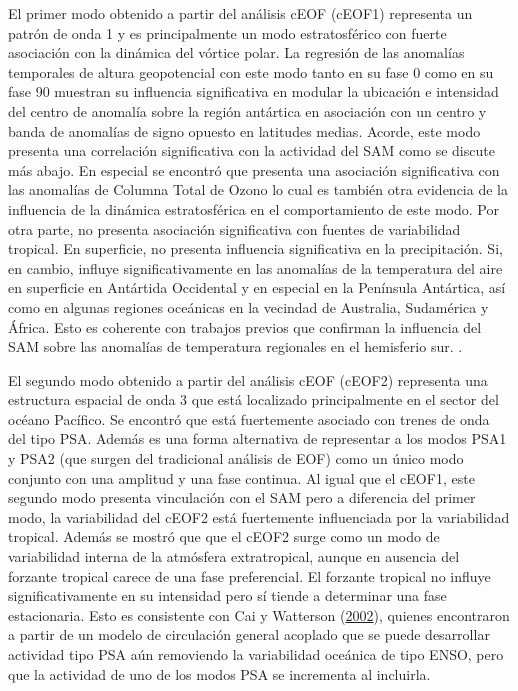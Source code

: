 \documentclass[12pt,oneside,a4paper]{reedthesis}
\begin{document}
El primer modo obtenido a partir del análisis cEOF (cEOF1) representa un patrón de onda 1 y es principalmente un modo estratosférico con fuerte asociación con la dinámica del vórtice polar.
La regresión de las anomalías temporales de altura geopotencial con este modo tanto en su fase 0 como en su fase 90 muestran su influencia significativa en modular la ubicación e intensidad del centro de anomalía sobre la región antártica en asociación con un centro y banda de anomalías de signo opuesto en latitudes medias.
Acorde, este modo presenta una correlación significativa con la actividad del SAM como se discute más abajo.
En especial se encontró que presenta una asociación significativa con las anomalías de Columna Total de Ozono lo cual es también otra evidencia de la influencia de la dinámica estratosférica en el comportamiento de este modo.
Por otra parte, no presenta asociación significativa con fuentes de variabilidad tropical.
En superficie, no presenta influencia significativa en la precipitación.
Si, en cambio, influye significativamente en las anomalías de la temperatura del aire en superficie en Antártida Occidental y en especial en la Península Antártica, así como en algunas regiones oceánicas en la vecindad de Australia, Sudamérica y África.
Esto es coherente con trabajos previos que confirman la influencia del SAM sobre las anomalías de temperatura regionales en el hemisferio sur.
.

El segundo modo obtenido a partir del análisis cEOF (cEOF2) representa una estructura espacial de onda 3 que está localizado principalmente en el sector del océano Pacífico.
Se encontró que está fuertemente asociado con trenes de onda del tipo PSA.
Además es una forma alternativa de representar a los modos PSA1 y PSA2 (que surgen del tradicional análisis de EOF) como un único modo conjunto con una amplitud y una fase continua.
Al igual que el cEOF1, este segundo modo presenta vinculación con el SAM pero a diferencia del primer modo, la variabilidad del cEOF2 está fuertemente influenciada por la variabilidad tropical.
Además se mostró que que el cEOF2 surge como un modo de variabilidad interna de la atmósfera extratropical, aunque en ausencia del forzante tropical carece de una fase preferencial.
El forzante tropical no influye significativamente en su intensidad pero sí tiende a determinar una fase estacionaria.
Esto es consistente con Cai y Watterson (\protect\hyperlink{ref-cai2002}{2002}), quienes encontraron a partir de un modelo de circulación general acoplado que se puede desarrollar actividad tipo PSA aún removiendo la variabilidad oceánica de tipo ENSO, pero que la actividad de uno de los modos PSA se incrementa al incluirla.
\end{document}
